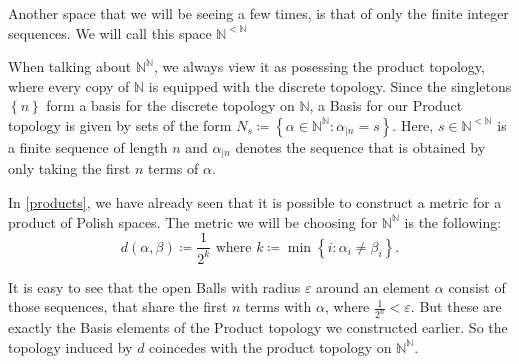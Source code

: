 \documentclass[10pt, a4paper, titlepage]{article}
\numberwithin{equation}{section}
\begin{document}
Another space that we will be seeing a few times, is that of only the finite integer
sequences. 
We will call this space $\mathbb{N}^{<\mathbb{N}}$

When talking about $\mathbb{N}^\mathbb{N}$, we always view it as posessing the
product topology, where every copy of $\mathbb{N}$ is equipped with the discrete
topology. 
Since the singletons $\left\{ n \right\} $ form a basis for the discrete
topology on $\mathbb{N}$, a Basis for our Product topology is given by sets of
the form $N_s \coloneq \left\{\alpha \in \mathbb{N}^\mathbb{N} : \alpha_{|n} =
s \right\}$. 
Here, $s \in \mathbb{N}^{<\mathbb{N}}$ is a finite sequence of
length $n$ and
$\alpha_{|n}$ denotes the sequence that is obtained by only taking the first $n$
terms of  $\alpha$.

In \autoref{products}, we have already seen that it is possible to construct a metric for a
product of Polish spaces.
The metric we will be choosing for $\mathbb{N}^\mathbb{N}$ is the following:
\[
	d\left( \alpha,\beta \right) \coloneq \frac{1}{2^k} \text{ where }
	k\coloneq \min\left\{i: \alpha_i \neq \beta_i\right\}
.\] 

It is easy to see that the open Balls with radius $\varepsilon$ around an
element $\alpha$ consist of those sequences, that share the first $n$
terms with $\alpha$, where  $\frac{1}{2^n} < \varepsilon$. 
But these are exactly the Basis elements of the Product topology we constructed
earlier. 
So the topology induced by $d$ coincedes with the product topology on
$\mathbb{N}^\mathbb{N}$.
\end{document}
